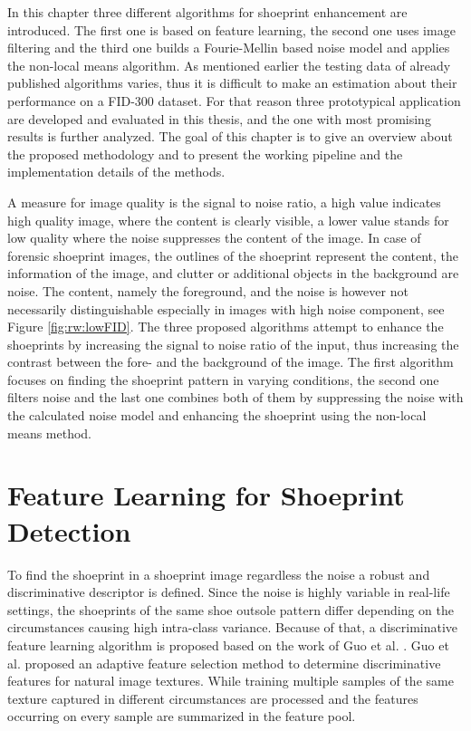 \documentclass[draft,final]{vutinfth} %
\begin{document}
\par
In this chapter three different algorithms for shoeprint enhancement are introduced.
The first one is based on feature learning, the second one uses image filtering and the third one builds a Fourie-Mellin based noise model and applies the non-local means algorithm.
As mentioned earlier the testing data of already published algorithms varies, thus it is difficult to make an estimation about their performance on a FID-300  \cite{kortylewski2014unsupervised} dataset.
For that reason three prototypical application are developed and evaluated in this thesis, and the one with most promising results is further analyzed.
The goal of this chapter is to give an overview about the proposed methodology and to present the working pipeline and the implementation details of the methods.
\par
A measure for image quality is the signal to noise ratio, a high value indicates high quality image, where the content is clearly visible, a lower value stands for low quality where the noise suppresses the content of the image.
In case of forensic shoeprint images, the outlines of the shoeprint represent the content, the information of the image, and clutter or additional objects in the background are noise. 
The content, namely the foreground, and the noise is however not necessarily distinguishable especially in images with high noise component, see Figure \ref{fig:rw:lowFID}.
The three proposed algorithms attempt to enhance the shoeprints by increasing the signal to noise ratio of the input, thus increasing the contrast between the fore- and the background of the image.
The first algorithm focuses on finding the shoeprint pattern in varying conditions, the second one filters noise and the last one combines both of them by suppressing the noise with the calculated noise model and enhancing the shoeprint using the non-local means method.

\section{Feature Learning for Shoeprint Detection}

\par
To find the shoeprint in a shoeprint image regardless the noise a robust and discriminative descriptor is defined.
Since the noise is highly variable in real-life settings, the shoeprints of the same shoe outsole  pattern differ depending on the circumstances causing high intra-class variance.
Because of that, a discriminative feature learning algorithm is proposed based on the work of Guo et al. \cite{guo2012discriminative}.
Guo et al. \cite{guo2012discriminative} proposed an adaptive feature selection method to determine discriminative features for natural image textures.
While training multiple samples of the same texture captured in different circumstances are processed and the features occurring on every sample are summarized in the feature pool.
\end{document}
